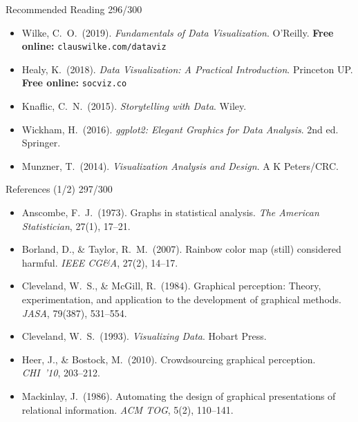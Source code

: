 \documentclass[10pt]{beamer}
\newcommand{\smark}[1]{\hfill{\scriptsize\color{codegray}#1}}
\begin{document}
\begin{frame}{Recommended Reading}
\smark{296/300}
\small
\begin{itemize}
    \item Wilke, C.\ O.\ (2019). \textit{Fundamentals of Data Visualization}. O'Reilly. \textbf{Free online:} \texttt{clauswilke.com/dataviz}
    \item Healy, K.\ (2018). \textit{Data Visualization: A Practical Introduction}. Princeton UP. \textbf{Free online:} \texttt{socviz.co}
    \item Knaflic, C.\ N.\ (2015). \textit{Storytelling with Data}. Wiley.
    \item Wickham, H.\ (2016). \textit{ggplot2: Elegant Graphics for Data Analysis}. 2nd ed. Springer.
    \item Munzner, T.\ (2014). \textit{Visualization Analysis and Design}. A K Peters/CRC.
\end{itemize}
\end{frame}

\begin{frame}{References (1/2)}
\smark{297/300}
\small
\begin{itemize}
    \item Anscombe, F.\ J.\ (1973). Graphs in statistical analysis. \textit{The American Statistician}, 27(1), 17--21.
    \item Borland, D., \& Taylor, R.\ M.\ (2007). Rainbow color map (still) considered harmful. \textit{IEEE CG\&A}, 27(2), 14--17.
    \item Cleveland, W.\ S., \& McGill, R.\ (1984). Graphical perception: Theory, experimentation, and application to the development of graphical methods. \textit{JASA}, 79(387), 531--554.
    \item Cleveland, W.\ S.\ (1993). \textit{Visualizing Data}. Hobart Press.
    \item Heer, J., \& Bostock, M.\ (2010). Crowdsourcing graphical perception. \textit{CHI~'10}, 203--212.
    \item Mackinlay, J.\ (1986). Automating the design of graphical presentations of relational information. \textit{ACM TOG}, 5(2), 110--141.
\end{itemize}
\end{frame}
\end{document}
